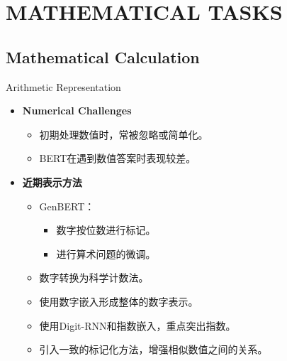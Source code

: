 \section{MATHEMATICAL TASKS}
\subsection{Mathematical Calculation}
\begin{frame}{Arithmetic Representation}
	\begin{itemize}
		\item \textbf{Numerical Challenges}
		      \begin{itemize}
			      \item 初期处理数值时，常被忽略或简单化。
			      \item BERT在遇到数值答案时表现较差。
		      \end{itemize}
		\item \textbf{近期表示方法}
		      \begin{itemize}
			      \item GenBERT：
			            \begin{itemize}
				            \item 数字按位数进行标记。
				            \item 进行算术问题的微调。
			            \end{itemize}
			      \item 数字转换为科学计数法。
			      \item 使用数字嵌入形成整体的数字表示。
			      \item 使用Digit-RNN和指数嵌入，重点突出指数。
			      \item 引入一致的标记化方法，增强相似数值之间的关系。
		      \end{itemize}
	\end{itemize}
\end{frame}

